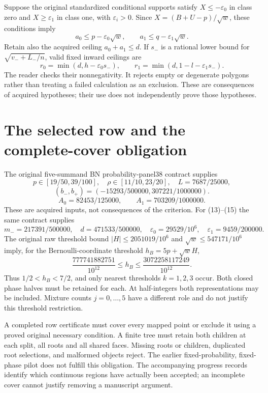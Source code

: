 \documentclass[11pt,a4paper]{article}
\begin{document}
Suppose the original standardized conditional supports satisfy
$X\le-\varepsilon_0$ in class zero and
$X\ge\varepsilon_1$ in class one, with $\varepsilon_i>0$.
Since $X=(B+U-p)/\sqrt w$, these conditions imply
\[
 a_0\le p-\varepsilon_0\sqrt w,\qquad
 a_1\le q-\varepsilon_1\sqrt w.
\]
Retain also the acquired ceiling $a_0+a_1\le d$.
If $s_-$ is a rational lower bound for $\sqrt{v_-+L_-/n}$,
valid fixed inward ceilings are
\[
 r_0=\min(d,h-\varepsilon_0s_-),\qquad
 r_1=\min(d,1-l-\varepsilon_1s_-).
 \tag{15}
\]
The reader checks their nonnegativity. It rejects empty or
degenerate polygons rather than treating a failed calculation as
an exclusion. These are consequences of acquired hypotheses;
their use does not independently prove those hypotheses.

\section{The selected row and the complete-cover obligation}
The original five-summand BN probability-panel38 contract supplies
\[
 p\in[19/50,39/100],\quad \rho\in[11/10,23/20],\quad L=7687/25000,
\]
\[
 (b_-,b_+)=(-15293/500000,307221/1000000).
\]
\[
 A_0=82453/125000,\qquad A_1=703209/1000000.
\]
These are acquired inputs, not consequences of the criterion.
For (13)--(15) the same contract supplies
\[
 m_-=217391/500000,\quad d=471533/500000,\quad
 \varepsilon_0=29529/10^6,\quad\varepsilon_1=9459/200000.
\]
The original raw threshold bound $|H|\le2051019/10^6$ and
$\sqrt w\le547171/10^6$ imply, for the Bernoulli-coordinate threshold
$h_B=5p+\sqrt wH$,
\[
 \frac{777741882751}{10^{12}}\le h_B\le
 \frac{3072258117249}{10^{12}}.
\]
Thus $1/2<h_B<7/2$, and only nearest thresholds $k=1,2,3$ occur.
Both closed phase halves must be retained for each. At half-integers
both representations may be included. Mixture counts $j=0,\ldots,5$
have a different role and do not justify this threshold restriction.

A completed row certificate must cover every mapped point or exclude
it using a proved original necessary condition. A finite tree must
retain both children at each split, all roots and all shared faces.
Missing roots or children, duplicated root selections, and malformed
objects reject. The earlier
fixed-probability, fixed-phase pilot does not fulfill this obligation.
The accompanying progress records identify which continuous regions
have actually been accepted; an incomplete cover cannot justify
removing a manuscript argument.
\end{document}
